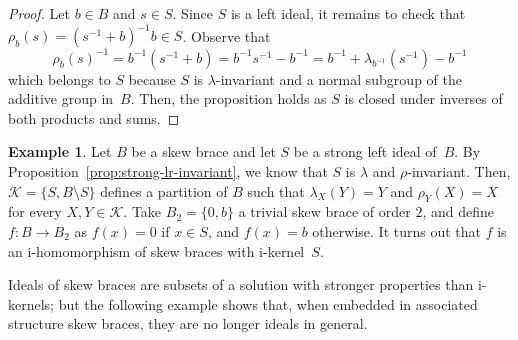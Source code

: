 \documentclass[12pt, a4paper, english]{article}
\theoremstyle{definition}
\newtheorem{exemple}[teorema]{Example}
\theoremstyle{remark}
\begin{document}
\begin{proof}
Let $b\in B$ and $s \in S$. Since $S$ is a left ideal, it remains to check that $\rho_b(s) = (s^{-1}+b)^{-1}b \in S$. Observe that
\[
 \rho_b(s)^{-1} = b^{-1}(s^{-1}+b) = b^{-1}s^{-1} - b^{-1} = b^{-1} + \lambda_{b^{-1}}(s^{-1}) - b^{-1}\]
which belongs to $S$ because $S$ is $\lambda$-invariant and a normal subgroup of the additive group in~$B$. Then, the proposition holds as $S$ is closed under inverses of both products and sums.
\end{proof}

\begin{exemple}
\label{ex:i-morfism-no-morfism}
Let $B$ be a skew brace and let $S$ be a strong left ideal of~$B$. By Proposition~\ref{prop:strong-lr-invariant}, we know that $S$ is $\lambda$ and $\rho$-invariant. Then, $\mathcal{K} = \{S, B\setminus S\}$ defines a partition of $B$ such that $\lambda_X(Y) = Y$ and $\rho_Y(X) = X$ for every $X,Y \in \mathcal{K}$. Take $B_2 = \{0,b\}$ a trivial skew brace of order $2$, and define $f\colon B \rightarrow B_2$ as $f(x) = 0$ if $x \in S$, and $f(x) = b$ otherwise. It turns out that $f$ is an i-homomorphism of skew braces with i-kernel~$S$.
\end{exemple}


Ideals of skew braces are subsets of a solution with stronger properties than i-kernels; but the following example shows that, when embedded in associated structure skew braces, they are no longer ideals in general.
\end{document}

